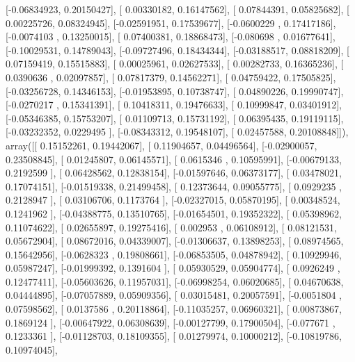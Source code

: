 \documentclass{article}
\begin{document}
       [-0.06834923,  0.20150427],
       [ 0.00330182,  0.16147562],
       [ 0.07844391,  0.05825682],
       [ 0.00225726,  0.08324945],
       [-0.02591951,  0.17539677],
       [-0.0600229 ,  0.17417186],
       [-0.0074103 ,  0.13250015],
       [ 0.07400381,  0.18868473],
       [-0.080698  ,  0.01677641],
       [-0.10029531,  0.14789043],
       [-0.09727496,  0.18434344],
       [-0.03188517,  0.08818209],
       [ 0.07159419,  0.15515883],
       [ 0.00025961,  0.02627533],
       [ 0.00282733,  0.16365236],
       [ 0.0390636 ,  0.02097857],
       [ 0.07817379,  0.14562271],
       [ 0.04759422,  0.17505825],
       [-0.03256728,  0.14346153],
       [-0.01953895,  0.10738747],
       [ 0.04890226,  0.19990747],
       [-0.0270217 ,  0.15341391],
       [ 0.10418311,  0.19476633],
       [ 0.10999847,  0.03401912],
       [-0.05346385,  0.15753207],
       [ 0.01109713,  0.15731192],
       [ 0.06395435,  0.19119115],
       [-0.03232352,  0.0229495 ],
       [-0.08343312,  0.19548107],
       [ 0.02457588,  0.20108848]]), array([[ 0.15152261,  0.19442067],
       [ 0.11904657,  0.04496564],
       [-0.02900057,  0.23508845],
       [ 0.01245807,  0.06145571],
       [ 0.0615346 ,  0.10595991],
       [-0.00679133,  0.2192599 ],
       [ 0.06428562,  0.12838154],
       [-0.01597646,  0.06373177],
       [ 0.03478021,  0.17074151],
       [-0.01519338,  0.21499458],
       [ 0.12373644,  0.09055775],
       [ 0.0929235 ,  0.2128947 ],
       [ 0.03106706,  0.1173764 ],
       [-0.02327015,  0.05870195],
       [ 0.00348524,  0.1241962 ],
       [-0.04388775,  0.13510765],
       [-0.01654501,  0.19352322],
       [ 0.05398962,  0.11074622],
       [ 0.02655897,  0.19275416],
       [ 0.002953  ,  0.06108912],
       [ 0.08121531,  0.05672904],
       [ 0.08672016,  0.04339007],
       [-0.01306637,  0.13898253],
       [ 0.08974565,  0.15642956],
       [-0.0628323 ,  0.19808661],
       [-0.06853505,  0.04878942],
       [ 0.10929946,  0.05987247],
       [-0.01999392,  0.1391604 ],
       [ 0.05930529,  0.05904774],
       [ 0.0926249 ,  0.12477411],
       [-0.05603626,  0.11957031],
       [-0.06998254,  0.06020685],
       [ 0.04670638,  0.04444895],
       [-0.07057889,  0.05909356],
       [ 0.03015481,  0.20057591],
       [-0.0051804 ,  0.07598562],
       [ 0.0137586 ,  0.20118864],
       [-0.11035257,  0.06960321],
       [ 0.00873867,  0.1869124 ],
       [-0.00647922,  0.06308639],
       [-0.00127799,  0.17900504],
       [-0.077671  ,  0.1233361 ],
       [-0.01128703,  0.18109355],
       [ 0.01279974,  0.10000212],
       [-0.10819786,  0.10974045],
\end{document}
